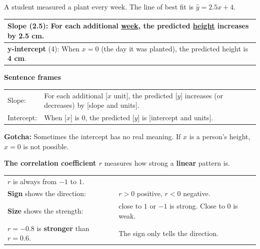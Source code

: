 \documentclass[11pt]{article}
\begin{document}

A student measured a plant every week. The line of best fit is $\hat{y} = 2.5x + 4$.

\begin{minipage}[c]{0.48\linewidth}\centering
{}
\end{minipage}\hfill
\begin{minipage}[c]{0.5\linewidth}
\renewcommand{\arraystretch}{1.3}
\begin{tabular}{|>{\raggedright\arraybackslash}p{3.2in}|}\hline
\textbf{Slope} (2.5): For each additional \underline{week}, the predicted \underline{height} increases by \textbf{2.5 cm}.\\ \hline
\textbf{y-intercept} (4): When $x = 0$ (the day it was planted), the predicted height is \textbf{4 cm}.\\ \hline
\end{tabular}
\end{minipage}

\vspace{0.6em}
\textbf{Sentence frames}

\vspace{0.2em}
\begin{tabular}{@{}ll}
Slope: & For each additional [$x$ unit], the predicted [$y$] increases (or decreases) by [slope and units].\\
Intercept: & When [$x$] is 0, the predicted [$y$] is [intercept and units].\\
\end{tabular}

\vspace{0.3em}
\textbf{Gotcha:} Sometimes the intercept has no real meaning. If $x$ is a person's height, $x = 0$ is not possible.

\vspace{1em}
\textbf{The correlation coefficient $r$} measures how strong a \textbf{linear} pattern is.

\begin{center}\end{center}

\begin{tabular}{@{}ll}
$r$ is always from $-1$ to $1$. & \\
\textbf{Sign} shows the direction: & $r > 0$ positive, \; $r < 0$ negative.\\
\textbf{Size} shows the strength: & close to $1$ or $-1$ is strong. Close to $0$ is weak.\\
$r = -0.8$ is \textbf{stronger} than $r = 0.6$. & The sign only tells the direction.\\
\end{tabular}
\end{document}
